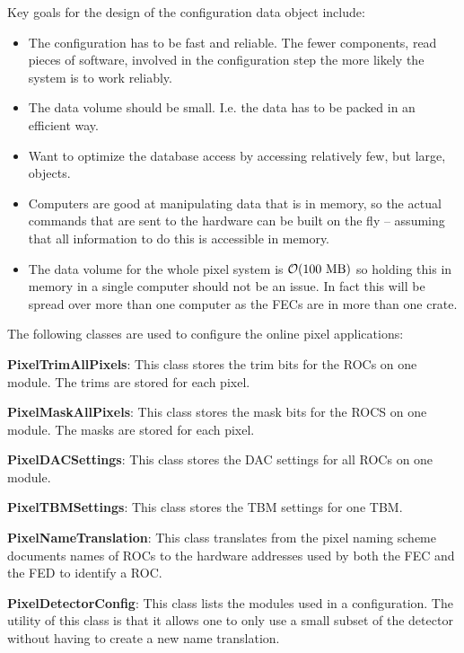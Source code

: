 Key goals for the design of the configuration
data object include:
\begin{itemize}
\item The configuration has to be fast and reliable.
      The fewer components, read pieces of software, 
      involved in the configuration step the more
      likely the system is to work reliably.
\item The data volume should be small. I.e. the data
      has to be packed in an efficient way.
\item Want to optimize the database access by accessing
      relatively few, but large, objects. 
\item Computers are good at manipulating data that is in
      memory, so the actual commands that are sent to 
      the hardware can be built on the fly -- assuming that
      all information to do this is accessible in memory.
\item The data volume for the whole pixel system is ${\cal O}(100\ {\rm MB})$
      so holding this in memory in a single computer should
      not be an issue. In fact this will be spread over
      more than one computer as the FECs are in more than
      one crate.
\end{itemize}

The following classes are used to configure the online pixel
applications:

\vskip 0.5cm
\noindent
{\bf PixelTrimAllPixels}: This class stores the trim bits for the
                          ROCs on one module. The trims are stored
                          for each pixel.

\vskip 0.5cm
\noindent
{\bf PixelMaskAllPixels}: This class stores the mask bits for the
                          ROCS on one module. The masks are stored
                          for each pixel.

\vskip 0.5cm
\noindent
{\bf PixelDACSettings}: This class stores the DAC settings for all
                        ROCs on one module. 

\vskip 0.5cm
\noindent
{\bf PixelTBMSettings}: This class stores the TBM settings for one
                        TBM.

\vskip 0.5cm
\noindent
{\bf PixelNameTranslation}: This class translates from the pixel 
                            naming scheme documents names of ROCs to
                            the hardware addresses used by both the
                            FEC and the FED to identify a ROC.

\vskip 0.5cm
\noindent
{\bf PixelDetectorConfig}: This class lists the modules used in a 
                           configuration. The utility of this class
                           is that it allows one to only use a small
                           subset of the detector without having to 
                           create a new name translation.

